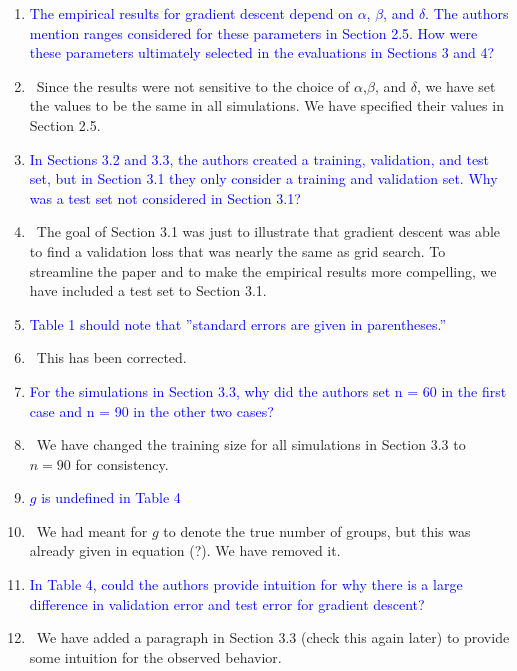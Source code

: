 \documentclass[]{article}
\newcommand{\point}[1]{\item \textcolor{blue}{#1}}
\newcommand{\reply}{\item[]\ }
\begin{document}
\begin{enumerate}
		\point{The empirical results for gradient descent depend on $\alpha$, $\beta$, and $\delta$. The authors mention ranges considered for these parameters in Section 2.5. How were these parameters ultimately selected in the evaluations in Sections 3 and 4?}
		
		\reply Since the results were not sensitive to the choice of $\alpha$,$\beta$, and $\delta$, we have set the values to be the same in all simulations. We have specified their values in Section 2.5.
		
		\point{In Sections 3.2 and 3.3, the authors created a training, validation, and test set, but in Section 3.1 they only consider a training and validation set. Why was a test set not considered in Section 3.1?}
		
		\reply The goal of Section 3.1 was just to illustrate that gradient descent was able to find a validation loss that was nearly the same as grid search. To streamline the paper and to make the empirical results more compelling, we have included a test set to Section 3.1.
		
		\point{Table 1 should note that ”standard errors are given in parentheses.”}
		
		\reply This has been corrected.
		
		\point{For the simulations in Section 3.3, why did the authors set n = 60 in the first case and
n = 90 in the other two cases?}
		
		\reply We have changed the training size for all simulations in Section 3.3 to $n=90$ for consistency.
		
		\point{$g$ is undefined in Table 4}
		
		\reply We had meant for $g$ to denote the true number of groups, but this was already given in equation (?). We have removed it.
		
		\point{In Table 4, could the authors provide intuition for why there is a large difference in validation error and test error for gradient descent?}
		
		\reply We have added a paragraph in Section 3.3 (check this again later) to provide some intuition for the observed behavior.
	\end{enumerate} 
	
\end{document}
